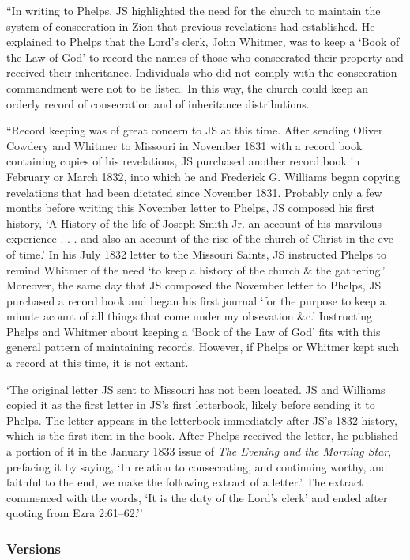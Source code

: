 			``In writing to Phelps, JS highlighted the need for the church to maintain the system of consecration in Zion that previous revelations had established. He explained to Phelps that the Lord's clerk, John Whitmer, was to keep a `Book of the Law of God' to record the names of those who consecrated their property and received their inheritance. Individuals who did not comply with the consecration commandment were not to be listed. In this way, the church could keep an orderly record of consecration and of inheritance distributions.

			``Record keeping was of great concern to JS at this time. After sending Oliver Cowdery and Whitmer to Missouri in November 1831 with a record book containing copies of his revelations, JS purchased another record book in February or March 1832, into which he and Frederick G. Williams began copying revelations that had been dictated since November 1831. Probably only a few months before writing this November letter to Phelps, JS composed his first history, `A History of the life of Joseph Smith J\uline{r}. an account of his marvilous experience . . . and also an account of the rise of the church of Christ in the eve of time.' In his July 1832 letter to the Missouri Saints, JS instructed Phelps to remind Whitmer of the need `to keep a history of the church \& the gathering.' Moreover, the same day that JS composed the November letter to Phelps, JS purchased a record book and began his first journal `for the purpose to keep a minute acount of all things that come under my obsevation \&c.' Instructing Phelps and Whitmer about keeping a `Book of the Law of God' fits with this general pattern of maintaining records. However, if Phelps or Whitmer kept such a record at this time, it is not extant.

			`The original letter JS sent to Missouri has not been located. JS and Williams copied it as the first letter in JS's first letterbook, likely before sending it to Phelps. The letter appears in the letterbook immediately after JS's 1832 history, which is the first item in the book. After Phelps received the letter, he published a portion of it in the January 1833 issue of \textit{The Evening and the Morning Star}, prefacing it by saying, `In relation to consecrating, and continuing worthy, and faithful to the end, we make the following extract of a letter.' The extract commenced with the words, `It is the duty of the Lord's clerk' and ended after quoting from Ezra 2:61--62.''
			
	\subsubsection{Versions}
		\label{DC85-V}
		

